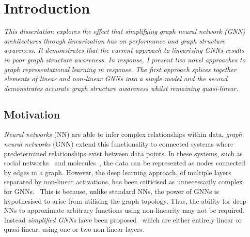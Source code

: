\chapter{Introduction}


\emph{
    This dissertation explores the effect that simplifying graph neural network (GNN) architectures through linearization has on performance and graph structure awareness.
    It demonstrates that the current approach to linearising GNNs results in poor graph structure awareness. In response, I present two novel approaches to graph representational learning in response.
    The first approach splices together elements of linear and non-linear GNNs into a single model and the second demonstrates accurate graph structure awareness whilst remaining quasi-linear.
}

\section{Motivation}
\label{sec:motivation}




\emph{Neural networks} (NN) are able to infer complex relationships within data, \emph{graph neural networks} (GNN) extend this functionality to connected systems where predetermined relationships exist between data points.
In these systems, such as social networks~\cite{pmlr-v70-gilmer17a} and molecules~\cite{DBLP:journals/corr/abs-1806-01973}, the data can be represented as nodes connected by edges in a graph.
However, the deep learning approach, of multiple layers separated by non-linear activations, has been criticised as unnecessarily complex for GNNs.~\cite{wu2019simplifying}
This is because, unlike standard NNs, the power of GNNs is hypothesised to arise from utilising the graph topology.
Thus, the ability for deep NNs to approximate arbitrary functions using non-linearity may not be required.
Instead \emph{simplified GNNs} have been proposed~\cite{chanpuriya2022simplified,chien2020adaptive,wu2019simplifying} which are either entirely linear or quasi-linear, using one or two non-linear layers.


